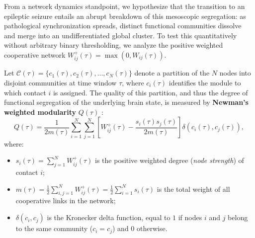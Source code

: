 From a network dynamics standpoint, we hypothesize that the transition to an epileptic seizure entails an abrupt breakdown of this mesoscopic segregation: as pathological synchronization spreads, distinct functional communities dissolve and merge into an undifferentiated global cluster. To test this quantitatively without arbitrary binary thresholding, we analyze the positive weighted cooperative network $W_{ij}^{+}(\tau) = \max(0, W_{ij}(\tau))$.

Let $\mathcal{C}(\tau) = \{c_1(\tau), c_2(\tau), \dots, c_N(\tau)\}$ denote a partition of the $N$ nodes into disjoint communities at time window $\tau$, where $c_i(\tau)$ identifies the module to which contact $i$ is assigned. The quality of this partition, and thus the degree of functional segregation of the underlying brain state, is measured by \textbf{Newman's weighted modularity} $Q(\tau)$ \cite{newman2018networks}:
\begin{equation}
    Q(\tau) = \frac{1}{2m(\tau)} \sum_{i=1}^{N} \sum_{j=1}^{N} \left[ W_{ij}^{+}(\tau) - \frac{s_i(\tau) s_j(\tau)}{2m(\tau)} \right] \delta\!\left(c_i(\tau), c_j(\tau)\right),
    \label{eq:modularity}
\end{equation}
where:
\begin{itemize}
    \item $s_i(\tau) = \sum_{j=1}^{N} W_{ij}^{+}(\tau)$ is the positive weighted degree (\textit{node strength}) of contact $i$;
    \item $m(\tau) = \frac{1}{2} \sum_{i,j=1}^{N} W_{ij}^{+}(\tau) = \frac{1}{2} \sum_{i=1}^{N} s_i(\tau)$ is the total weight of all cooperative links in the network;
    \item $\delta(c_i, c_j)$ is the Kronecker delta function, equal to $1$ if nodes $i$ and $j$ belong to the same community ($c_i = c_j$) and $0$ otherwise.
\end{itemize}

